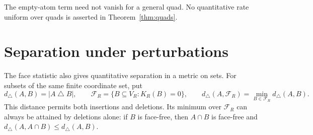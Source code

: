 The empty-atom term need not vanish for a general quad. No quantitative rate uniform over quads is asserted in Theorem~\ref{thm:quads}.

\section{Separation under perturbations}\label{sec:perturbations}

The face statistic also gives quantitative separation in a metric on sets. For subsets of the same finite coordinate set, put
\[
 d_\triangle(A,B)=|A\mathbin\triangle B|,\qquad
 \mathcal F_R=\{B\subseteq V_R:K_R(B)=0\},\qquad
 d_\triangle(A,\mathcal F_R)=\min_{B\in\mathcal F_R}d_\triangle(A,B).
\]
This distance permits both insertions and deletions. Its minimum over $\mathcal F_R$ can always be attained by deletions alone: if $B$ is face-free, then $A\cap B$ is face-free and $d_\triangle(A,A\cap B)\le d_\triangle(A,B)$.

